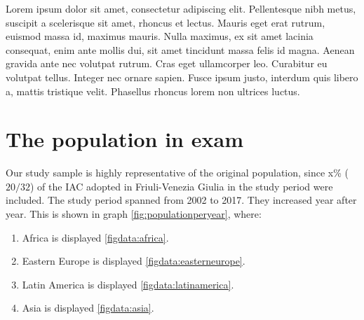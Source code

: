 

\label{chap:materialsandmethods}
Lorem ipsum dolor sit amet, consectetur adipiscing elit. Pellentesque nibh metus, suscipit a scelerisque sit amet, rhoncus et lectus. Mauris eget erat rutrum, euismod massa id, maximus mauris. Nulla maximus, ex sit amet lacinia consequat, enim ante mollis dui, sit amet tincidunt massa felis id magna. Aenean gravida ante nec volutpat rutrum. Cras eget ullamcorper leo. Curabitur eu volutpat tellus. Integer nec ornare sapien. Fusce ipsum justo, interdum quis libero a, mattis tristique velit. Phasellus rhoncus lorem non ultrices luctus.

\section{The population in exam}\label{sec:thepopulationinexam}
Our study sample is highly representative of the original population, since x\% ($20/32$) of the IAC adopted in Friuli-Venezia Giulia in the study period were included.
The study period spanned from 2002 to 2017. They increased year after year. This is shown in graph \ref{fig:populationperyear}, where:

\begin{enumerate}
	\item Africa is displayed \ref{figdata:africa}.
	\item Eastern Europe is displayed \ref{figdata:easterneurope}.
	\item Latin America is displayed \ref{figdata:latinamerica}.
	\item Asia is displayed \ref{figdata:asia}.
\end{enumerate}


